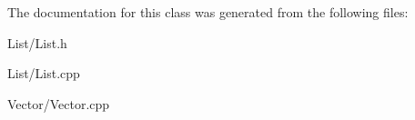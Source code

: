 The documentation for this class was generated from the following files\+:\begin{DoxyCompactItemize}
\item 
List/List.\+h\item 
List/List.\+cpp\item 
Vector/Vector.\+cpp\end{DoxyCompactItemize}
